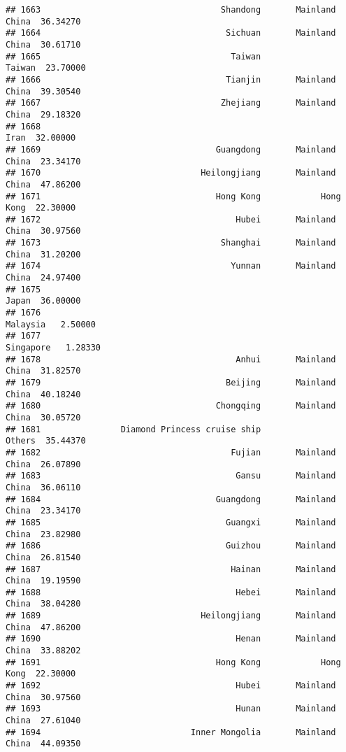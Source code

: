\documentclass[
]{article}
\begin{document}
\begin{verbatim}
## 1663                                    Shandong       Mainland China  36.34270
## 1664                                     Sichuan       Mainland China  30.61710
## 1665                                      Taiwan               Taiwan  23.70000
## 1666                                     Tianjin       Mainland China  39.30540
## 1667                                    Zhejiang       Mainland China  29.18320
## 1668                                                             Iran  32.00000
## 1669                                   Guangdong       Mainland China  23.34170
## 1670                                Heilongjiang       Mainland China  47.86200
## 1671                                   Hong Kong            Hong Kong  22.30000
## 1672                                       Hubei       Mainland China  30.97560
## 1673                                    Shanghai       Mainland China  31.20200
## 1674                                      Yunnan       Mainland China  24.97400
## 1675                                                            Japan  36.00000
## 1676                                                         Malaysia   2.50000
## 1677                                                        Singapore   1.28330
## 1678                                       Anhui       Mainland China  31.82570
## 1679                                     Beijing       Mainland China  40.18240
## 1680                                   Chongqing       Mainland China  30.05720
## 1681                Diamond Princess cruise ship               Others  35.44370
## 1682                                      Fujian       Mainland China  26.07890
## 1683                                       Gansu       Mainland China  36.06110
## 1684                                   Guangdong       Mainland China  23.34170
## 1685                                     Guangxi       Mainland China  23.82980
## 1686                                     Guizhou       Mainland China  26.81540
## 1687                                      Hainan       Mainland China  19.19590
## 1688                                       Hebei       Mainland China  38.04280
## 1689                                Heilongjiang       Mainland China  47.86200
## 1690                                       Henan       Mainland China  33.88202
## 1691                                   Hong Kong            Hong Kong  22.30000
## 1692                                       Hubei       Mainland China  30.97560
## 1693                                       Hunan       Mainland China  27.61040
## 1694                              Inner Mongolia       Mainland China  44.09350

\end{verbatim}
\end{document}
